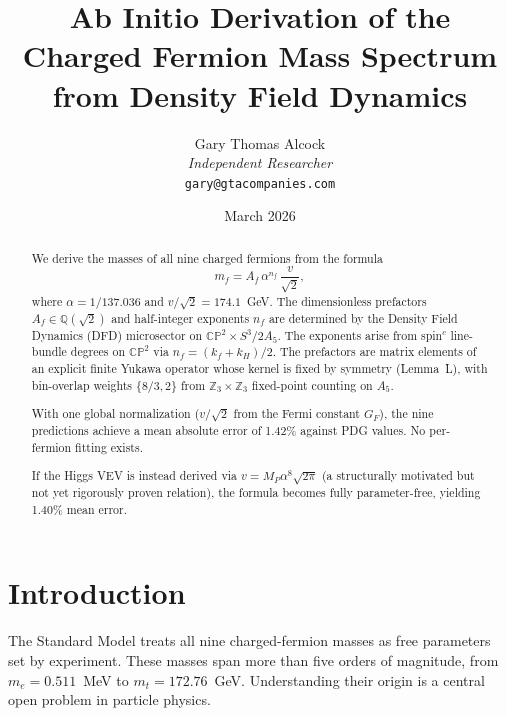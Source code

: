 \documentclass[11pt,a4paper]{article}
\newcommand{\CP}{\mathbb{CP}}
\newcommand{\Z}{\mathbb{Z}}
\theoremstyle{remark}
\begin{document}
\title{Ab Initio Derivation of the Charged Fermion Mass Spectrum\\
from Density Field Dynamics}

\author{Gary Thomas Alcock\\
\textit{Independent Researcher}\\
\texttt{gary@gtacompanies.com}}

\date{March 2026}

\maketitle

\begin{abstract}
We derive the masses of all nine charged fermions from the formula
\[
m_f = A_f\,\alpha^{n_f}\,\frac{v}{\sqrt{2}},
\]
where $\alpha = 1/137.036$ and $v/\sqrt{2} = 174.1$~GeV.
The dimensionless prefactors $A_f \in \mathbb{Q}(\sqrt{2})$ and half-integer
exponents $n_f$ are determined by the Density Field Dynamics (DFD)
microsector on $\CP^2 \times S^3/2A_5$.
The exponents arise from spin$^c$ line-bundle degrees on $\CP^2$ via
$n_f = (k_f + k_H)/2$.
The prefactors are matrix elements of an explicit finite Yukawa operator
whose kernel is fixed by symmetry (Lemma~L), with bin-overlap weights
$\{8/3, 2\}$ from $\Z_3 \times \Z_3$ fixed-point counting on $A_5$.

With one global normalization ($v/\sqrt{2}$ from the Fermi constant $G_F$),
the nine predictions achieve a mean absolute error of 1.42\% against PDG
values.  No per-fermion fitting exists.

If the Higgs VEV is instead derived via $v = M_P\alpha^8\sqrt{2\pi}$
(a structurally motivated but not yet rigorously proven relation), the
formula becomes fully parameter-free, yielding 1.40\% mean error.
\end{abstract}

\tableofcontents

\section{Introduction}
\label{sec:intro}

The Standard Model treats all nine charged-fermion masses as free parameters
set by experiment.  These masses span more than five orders of magnitude, from
$m_e = 0.511$~MeV to $m_t = 172.76$~GeV.  Understanding their origin is a
central open problem in particle physics.
\end{document}

